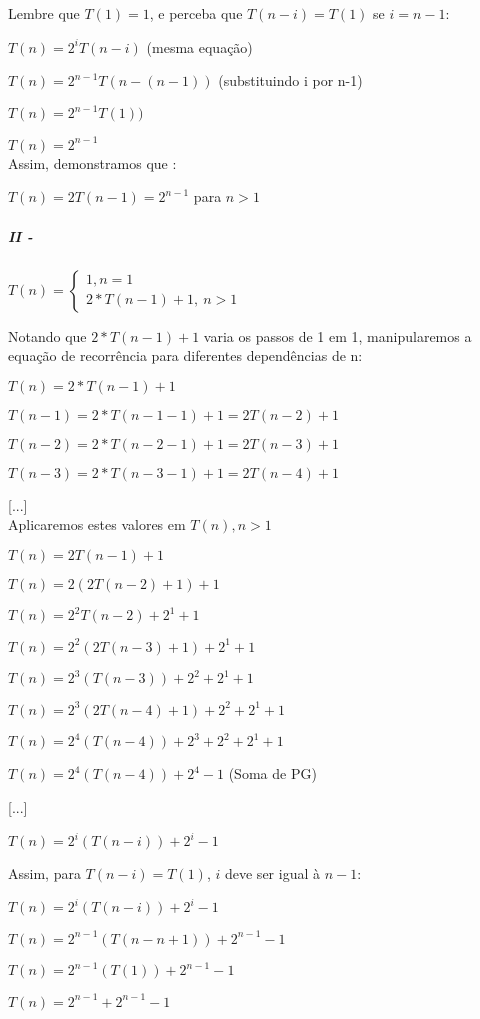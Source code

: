 \documentclass[a4paper, twocolumn]{article}
\theoremstyle{definition}
\begin{document}
Lembre que $T(1) = 1$, e perceba que $T(n-i) = T(1)$ se $i=n-1$:

$T(n) = 2^{i}T(n-i)$ (mesma equação)

$T(n) = 2^{n-1}T(n-(n-1))$ (substituindo i por n-1)

$T(n) = 2^{n-1}T(1))$

$T(n) = 2^{n-1}$ \\

Assim, demonstramos que :

$T(n) = 2T(n-1) = 2^{n-1}$ para $n > 1$


\subparagraph{II - } {$T(n) = \begin{cases} 
		1, n  = 1\\
		2*T(n-1) + 1, \ n > 1
	\end{cases}$}

Notando que $2*T(n-1) + 1$ varia os passos de 1 em 1, manipularemos a equação de recorrência para diferentes dependências de n:

$T(n) = 2*T(n-1) + 1$

$T(n-1) = 2*T(n-1-1) + 1 = 2T(n-2) + 1$

$T(n-2) = 2*T(n-2-1) + 1 = 2T(n-3) + 1$

$T(n-3) = 2*T(n-3-1) + 1 = 2T(n-4) + 1$

[...] \\

Aplicaremos estes valores em $T(n), n>1$

$T(n) = 2T(n-1) + 1$

$T(n) = 2(2T(n-2) + 1) + 1$

$T(n) = 2^{2}T(n-2) +2^1 + 1$

$T(n) = 2^{2}(2T(n-3) + 1) +2^1 + 1$

$T(n) = 2^{3}(T(n-3)) + 2^2 +2^1 + 1$

$T(n) = 2^{3}(2T(n-4) + 1) + 2^2 +2^1 + 1$

$T(n) = 2^{4}(T(n-4)) + 2^3 + 2^2 +2^1 + 1$

$T(n) = 2^{4}(T(n-4)) + 2^{4} - 1$ (Soma de PG)

[...]

$T(n) = 2^{i}(T(n-i)) + 2^{i} - 1$

Assim, para $T(n-i) = T(1)$, $i$ deve ser igual à $n-1$:

$T(n) = 2^{i}(T(n-i)) + 2^{i} - 1$

$T(n) = 2^{n-1}(T(n-n+1)) + 2^{n-1} - 1$

$T(n) = 2^{n-1}(T(1)) + 2^{n-1} - 1$

$T(n) = 2^{n-1} + 2^{n-1} - 1$
\end{document}
